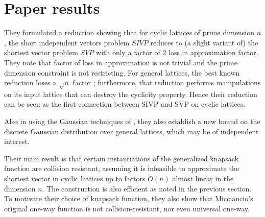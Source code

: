 \section{Paper results}
They formulated a reduction showing that for cyclic lattices of prime dimension $n$, the short independent vectors problem $SIVP$ reduces to (a slight variant of) the shortest vector problem $SVP$ with only a factor of $2$ loss in approximation factor. They note that factor of loss in approximation is not trivial and the prime dimension constraint is not restricting. For general lattices, the best known reduction loses a $\sqrt n$ factor \cite{Micciancio2002}; furthermore, that reduction performs manipulations on its input lattice that can destroy the cyclicity property. Hence their reduction can be seen as the first connection between SIVP and SVP on cyclic lattices.
\par
Also in using the Gaussian techniques of \cite{Micciancio:2007:WAR:1328722.1328733}, they also establish a new bound on the discrete Gaussian distribution over general lattices, which may be of independent interest.
\par
Their main result is that certain instantiations of the generalized knapsack function are collision resistant, assuming it is infeasible to approximate the shortest vector in cyclic lattices up to factors $\tilde O(n)$ almost linear in the dimension $n$. The construction is also efficient as noted in the previous section. To motivate their choice of knapsack function, they also show that Micciancio’s original one-way function is not collision-resistant, nor even universal one-way.